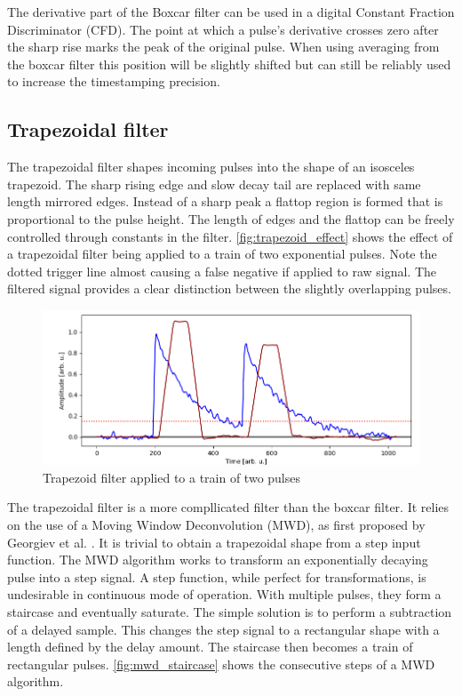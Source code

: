 The derivative part of the Boxcar filter can be used in a
digital Constant Fraction Discriminator (CFD).
The point at which a pulse's derivative crosses zero after 
the sharp rise marks the peak of the original pulse. 
When using averaging from the boxcar filter this position 
will be slightly shifted but can still be reliably used to increase
the timestamping precision.

\subsection{Trapezoidal filter}
The trapezoidal filter shapes incoming pulses into the 
shape of an isosceles trapezoid. The sharp rising edge and 
slow decay tail are replaced with same length mirrored edges.
Instead of a sharp peak a flattop region is formed that is proportional
to the pulse height. The length of edges and the flattop can be freely
controlled through constants in the filter. \autoref{fig:trapezoid_effect}
shows the effect of a trapezoidal filter being applied to a train
of two exponential pulses. Note the dotted trigger line almost 
causing a false negative if applied to raw signal. 
The filtered signal provides a clear distinction 
between the slightly overlapping pulses.

\begin{figure}[H]
  \centering
  \includegraphics[width=\linewidth]{media/trapezoid_effect.png}
  \caption{Trapezoid filter applied to a train of two pulses}
  \label{fig:trapezoid_effect} 
\end{figure}


The trapezoidal filter is a more compllicated filter than the boxcar filter.
It relies on the use of a Moving Window Deconvolution (MWD),
as first proposed by Georgiev et al. \cite{mwd}.
It is trivial to obtain a trapezoidal shape from a step input function.
The MWD algorithm works to transform an exponentially decaying pulse into 
a step signal. A step function, while perfect for transformations,
is undesirable in continuous mode of operation.
With multiple pulses, they form a staircase and eventually saturate.
The simple solution is to perform a subtraction of a delayed sample.
This changes the step signal
to a rectangular shape with a length defined by the delay amount.
The staircase then becomes a train of rectangular pulses.
\autoref{fig:mwd_staircase} shows the consecutive steps of a MWD algorithm.

